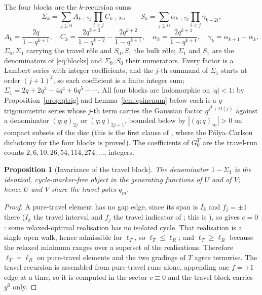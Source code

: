 \documentclass[11pt]{article}
\theoremstyle{plain}
\newtheorem{proposition}[theorem]{Proposition}
\theoremstyle{definition}
\theoremstyle{remark}
\theoremstyle{plain}\newtheorem*{maintheorem}{Main Theorem}
\begin{document}
The four blocks are the $k$-recursion sums
\begin{equation}\label{eq:krec}
  \Sigma_k=\sum_{j\ge0}A_{k+2j}\prod_{i<j}C_{k+2i},\qquad
  S_k=\sum_{j\ge0}\alpha_{k+2j}\prod_{i<j}\gamma_{k+2i},
\end{equation}
\[
  A_k=\frac{2q}{1-q^{k+1}},\quad
  C_k=\frac{2q^{k+3}}{1-q^{k+2}}-\frac{2q^{k+2}}{1-q^{k+1}},\quad
  \alpha_k=\frac{2q^{k+1}}{1-q^{k+1}},\quad
  \gamma_k=\alpha_{k+1}-\alpha_k ,
\]
$\Sigma_0,\Sigma_1$ carrying the travel r\^ole and $S_0,S_1$ the bulk r\^ole; $\Sigma_1$ and $S_1$
are the denominators of \eqref{eq:blocks} and $\Sigma_0,S_0$ their numerators. Every factor is a
Lambert series with integer coefficients, and the $j$-th summand of $\Sigma_1$ starts at order
$(j+1)^2$, so each coefficient is a finite integer sum; $\Sigma_1=2q+2q^3-4q^4+6q^5-\cdots$. All
four blocks are holomorphic on $|q|<1$: by Proposition~\ref{prop:qtrig} and
Lemma~\ref{lem:qsinenum} below each is a $q$-trigonometric series whose $j$-th term carries the
Gaussian factor $q^{j^2+O(j)}$ against a denominator $(q;q)_{2j}$ or $(q;q)_{2j+1}$, bounded below
by $|(q;q)_\infty|>0$ on compact subsets of the disc \textup{(}this is the first clause of
{\cite[Theorem \textup{thm:blocks}]{Bonfioli2026bB}}, where the P\'olya--Carlson dichotomy for the four blocks is proved\textup{)}.
The coefficients of $G^T_0$ are the travel-run counts $2,6,10,26,54,114,274,\dots$, integers.

\begin{proposition}[Invariance of the travel block]\label{prop:travelinv}
The denominator $1-\Sigma_1$ is the identical, cycle-marker-free object in the generating functions
of $U$ and of $V$; hence $U$ and $V$ share the travel poles $q_m$.
\end{proposition}
\begin{proof}
A pure-travel element has no gap edge, since its span is $I_k$ and $f_j=\pm1$ there \textup{(}$I_k$ the travel interval and $f_j$ the travel indicator of
\cite[\S\,\textup{sec:sitecost}]{Bonfioli2026bB}; this is \cite[Corollary \textup{cor:localzero}]{Bonfioli2026bB}\textup{)}, so
{\cite[Theorem ``no gap edge forces $c=0$'', \textup{thm:nogap}]{Bonfioli2026bB}} gives $c=0$: some relaxed-optimal realisation has no isolated cycle. That
realisation is a single open walk, hence admissible for $\ell_T$, so $\ell_T\le\ell_R$; and
$\ell_T\ge\ell_R$ because the relaxed minimum ranges over a superset of the realisations. Therefore
$\ell_T=\ell_R$ on pure-travel elements and the two gradings of $T$ agree termwise. The travel
recursion is assembled from pure-travel runs alone, appending one $f=\pm1$ edge at a time, so it is
computed in the sector $c\equiv0$ and the travel block carries $y^0$ only.
\end{proof}
\end{document}
